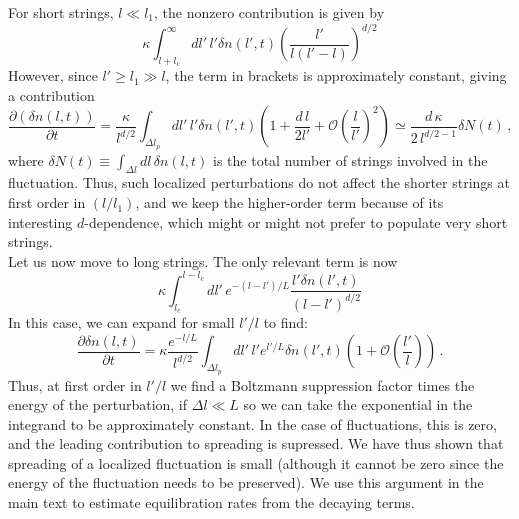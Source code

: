 \documentclass[a4paper,11pt]{article}
\newcommand{\lr}[1]{\left(#1\right)}
\begin{document}
For short strings, $l\ll l_1$, the nonzero contribution is given by 
\begin{equation}
\kappa\int_{l+l_c}^{\infty}{dl'\, l'\delta n(l',t)\lr{\frac{l'}{l(l'-l)}}^{d/2}}
\end{equation}
However, since $l'\geq l_1\gg l$, the term in brackets is approximately constant, giving a contribution
\begin{equation}
    \frac{\partial \lr{\delta n(l,t)}}{\partial t}= 
    \frac{\kappa}{l^{d/2}} \int_{\Delta l_p}{dl' \,  l'\delta n(l',t)\lr{1+\frac{d\, l}{2l'}+\mathcal{O}\lr{\frac{l}{l'}}^2}}\simeq\frac{d\, \kappa}{2\, l^{d/2-1}}\delta N(t) \, ,
\end{equation}
where $\delta N(t)\equiv \int_{\Delta l}{dl\, \delta n(l,t)}$ is the total number of strings involved in the fluctuation.
Thus, such localized perturbations do not affect the shorter strings at first order in $(l/l_1)$, and we keep the higher-order term because of its interesting $d$-dependence, which might or might not prefer to populate very short strings.
\\

Let us now move to long strings. 
The only relevant term is now 
\begin{equation}
\kappa\int_{l_c}^{l-l_c}{dl'\, e^{-(l-l')/L}\frac{l'\delta n(l',t)}{(l-l')^{d/2}}}
\end{equation}
In this case, we can expand for small $l'/l$ to find:
\begin{equation}
\frac{\partial \delta n(l,t)}{\partial t} = \kappa \frac{e^{-l/L}}{l^{d/2}}\int_{\Delta l_p}{dl' \, l'e^{l'/L}\delta n(l',t)\lr{1+\mathcal{O}\lr{\frac{l'}{l}}}}\, .
\end{equation}
Thus, at first order in $l'/l$ we find a Boltzmann suppression factor times the energy of the perturbation, if $\Delta l\ll L$ so we can take the exponential
in the integrand to be approximately constant. 
In the case of fluctuations, this is zero, and the leading contribution to spreading is supressed.
We have thus shown that spreading of a localized fluctuation is small (although it cannot be zero since the energy of the fluctuation needs to be preserved).
We use this argument in the main text to estimate equilibration rates from the decaying terms.



\end{document}
